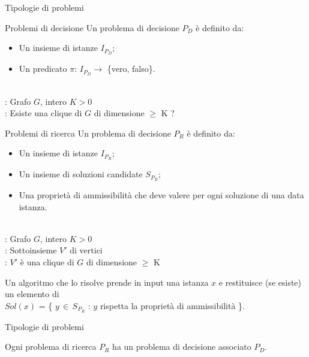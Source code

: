 \documentclass[10pt,a4paper]{article}
\begin{document}
\begin{multicols}{3}
\begin{textbox}{Tipologie di problemi}
\begin{textbox}{Problemi di decisione}
Un problema di decisione \(P_D\) è definito da:
\begin{itemize}[leftmargin=*]
    \item Un insieme di istanze \(I_{P_D}\);
    \item Un predicato \(\pi\): \(I_{P_D} \rightarrow\) \{vero, falso\}.
\end{itemize}

\\
: Grafo \(G\), intero \(K > 0\) \\
: Esiste una clique di \(G\) di dimensione \(\geq\) K ?

\end{textbox}

\begin{textbox}{Problemi di ricerca}
Un problema di decisione \(P_R\) è definito da:
\begin{itemize}[leftmargin=*]
    \item Un insieme di istanze \(I_{P_R}\);
    \item Un insieme di soluzioni candidate  \(S_{P_R}\);
    \item Una proprietà di ammissibilità che deve valere per ogni soluzione di una
    data istanza.
\end{itemize}

\\
: Grafo \(G\), intero \(K > 0\) \\
: Sottoinsieme \(V'\) di vertici \\
: \(V'\) è una clique di \(G\) di dimensione \(\geq\) K

Un algoritmo che lo risolve prende in input una
istanza \(x\) e restituisce (se esiste) un elemento di\\
\(Sol(x)\) = \{ \(y\,\in\,S_{P_R}\) : \(y\) rispetta la proprietà di ammissibilità \}.

\end{textbox}

\end{textbox}

\begin{textbox}{Tipologie di problemi}

Ogni problema di ricerca \(P_R\) ha un problema di decisione associato \(P_D\).\\


\end{textbox}
\end{multicols}
\end{document}
